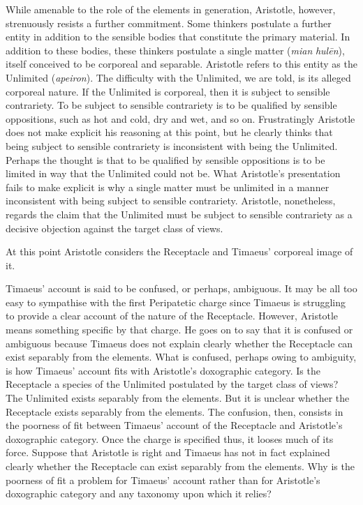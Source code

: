 While amenable to the role of the elements in generation, Aristotle, however, strenuously resists a further commitment. Some thinkers postulate a further entity in addition to the sensible bodies that constitute the primary material. In addition to these bodies, these thinkers postulate a single matter (\emph{mian} \emph{hulēn}), itself conceived to be corporeal and separable. Aristotle refers to this entity as the Unlimited (\emph{apeiron}). The difficulty with the Unlimited, we are told, is its alleged corporeal nature. If the Unlimited is corporeal, then it is subject to sensible contrariety. To be subject to sensible contrariety is to be qualified by sensible oppositions, such as hot and cold, dry and wet, and so on. Frustratingly Aristotle does not make explicit his reasoning at this point, but he clearly thinks that being subject to sensible contrariety is inconsistent with being the Unlimited. Perhaps the thought is that to be qualified by sensible oppositions is to be limited in way that the Unlimited could not be. What Aristotle's presentation fails to make explicit is why a single matter must be unlimited in a manner inconsistent with being subject to sensible contrariety. Aristotle, nonetheless, regards the claim that the Unlimited must be subject to sensible contrariety as a decisive objection against the target class of views.

At this point Aristotle considers the Receptacle and Timaeus' corporeal image of it.

Timaeus' account is said to be confused, or perhaps, ambiguous. It may be all too easy to sympathise with the first Peripatetic charge since Timaeus is struggling to provide a clear account of the nature of the Receptacle. However, Aristotle means something specific by that charge. He goes on to say that it is confused or ambiguous because Timaeus does not explain clearly whether the Receptacle can exist separably from the elements. What is confused, perhaps owing to ambiguity, is how Timaeus' account fits with Aristotle's doxographic category. Is the Receptacle a species of the Unlimited postulated by the target class of views? The Unlimited exists separably from the elements. But it is unclear whether the Receptacle exists separably from the elements. The confusion, then, consists in the poorness of fit between Timaeus' account of the Receptacle and Aristotle's doxographic category. Once the charge is specified thus, it looses much of its force. Suppose that Aristotle is right and Timaeus has not in fact explained clearly whether the Receptacle can exist separably from the elements. Why is the poorness of fit a problem for Timaeus' account rather than for Aristotle's doxographic category and any taxonomy upon which it relies?

